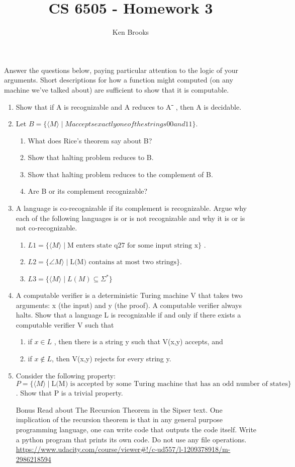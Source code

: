 \documentclass[12pt]{article}
\title{CS 6505 - Homework 3}
\author{Ken Brooks}
\begin{document}
Answer the questions below, paying particular attention to the logic of your arguments. Short descriptions for how a function might computed (on any machine we’ve talked about) are sufficient to show that it is computable.
\begin{enumerate}
	\item Show that if A is recognizable and A reduces to Aˉ , then A is decidable.
	\item Let $ B = \{\langle M \rangle \mid M accepts exactly one of the strings 00 and 11\}$.
		\begin{enumerate}
		\item What does Rice's theorem say about B?
		\item Show that halting problem reduces to B.
		\item Show that halting problem reduces to the complement of B.
		\item Are B or its complement recognizable?
\end{enumerate}\item A language is co-recognizable if its complement is recognizable. Argue why each of the following languages is or is not recognizable and why it is or is not co-recognizable.
\begin{enumerate}
\item $L1 = \{\langle M \rangle \mid \mbox{M enters state q27 for some input string x}\}$ .
\item $L2 = \{\angle M \rangle \mid \mbox{L(M) contains at most two strings}\}$.
\item $L3 = \{\langle M \rangle \mid L(M) \subseteq \Sigma^{*}\}$
\end{enumerate}\item A computable verifier is a deterministic Turing machine V that takes two arguments: x (the input) and y (the proof). A computable verifier always halts. Show that a language L is recognizable if and only if there exists a computable verifier V such that
\begin{enumerate}
\item if $x \in L$ , then there is a string y such that V(x,y) accepts, and
\item if $x \notin L$, then V(x,y) rejects for every string y.
\end{enumerate}\item Consider the following property: $P = \{\langle M \rangle \mid \mbox{L(M) is accepted by some Turing machine that has an odd number of states} \}$ . Show that P is a trivial property.
\item [Bonus] Read about The Recursion Theorem in the Sipser text. One implication of the recursion theorem is that in any general purpose programming language, one can write code that outputs the code itself. Write a python program that prints its own code. Do not use any file operations.
\\[0.2in] \url{https://www.udacity.com/course/viewer#!/c-ud557/l-1209378918/m-2986218594}

\end{enumerate}
\end{document}
